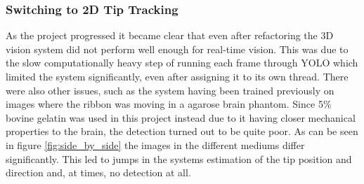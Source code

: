 \subsubsection{Switching to 2D Tip Tracking}
As the project progressed it became clear that even after refactoring the 3D vision system did not perform well enough for real-time vision. This was due to the slow computationally heavy step of running each frame through YOLO which limited the system significantly, even after assigning it to its own thread. There were also other issues, such as the system having been trained previously on images where the ribbon was moving in a agarose brain phantom. Since 5\% bovine gelatin was used in this project instead due to it having closer mechanical properties to the brain, the detection turned out to be quite poor. As can be seen in figure \ref{fig:side_by_side} the images in the different mediums differ significantly. This led to jumps in the systems estimation of the tip position and direction and, at times, no detection at all.
